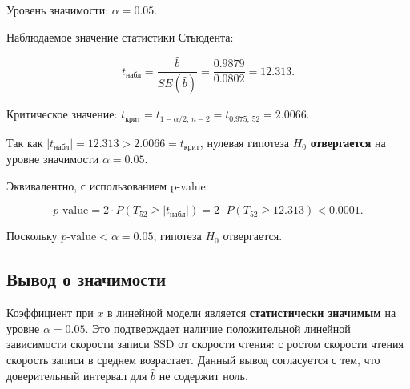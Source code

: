 Уровень значимости: \(\alpha = 0.05\).

Наблюдаемое значение статистики Стьюдента:

\[
t_{\text{набл}} = \frac{\hat{b}}{SE(\hat{b})} = \frac{0.9879}{0.0802} = 12.313.
\]

Критическое значение: \(t_{\text{крит}} = t_{1-\alpha/2;\, n-2} = t_{0.975;\,52} = 2.0066\).

Так как \(|t_{\text{набл}}| = 12.313 > 2.0066 = t_{\text{крит}}\), нулевая гипотеза \(H_0\) \textbf{отвергается} на уровне значимости \(\alpha = 0.05\).

Эквивалентно, с использованием p-value:

\[
p\text{-value} = 2 \cdot P(T_{52} \geq |t_{\text{набл}}|) = 2 \cdot P(T_{52} \geq 12.313) < 0.0001.
\]

Поскольку \(p\text{-value} < \alpha = 0.05\), гипотеза \(H_0\) отвергается.

\subsection{Вывод о значимости}

Коэффициент при \(x\) в линейной модели является \textbf{статистически значимым} на уровне \(\alpha = 0.05\). Это подтверждает наличие положительной линейной зависимости скорости записи SSD от скорости чтения: с ростом скорости чтения скорость записи в среднем возрастает. Данный вывод согласуется с тем, что доверительный интервал для \(\hat{b}\) не содержит ноль.

